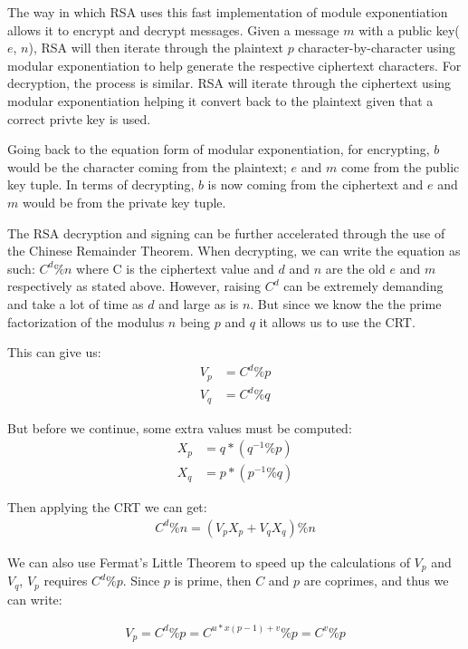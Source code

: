 \documentclass[11pt]{article}
\begin{document}
		The way in which RSA uses this fast implementation of module exponentiation allows it to encrypt and decrypt messages. Given a message $m$ with a public key($e$, $n$), RSA will then iterate through the plaintext $p$ character-by-character using modular exponentiation to help generate the respective ciphertext characters. For decryption, the process is similar. RSA will iterate through the ciphertext using modular exponentiation helping it convert back to the plaintext given that a correct privte key is used. 

		Going back to the equation form of modular exponentiation, for encrypting, $b$ would be the character coming from the plaintext; $e$ and $m$ come from the public key tuple. In terms of decrypting, $b$ is now coming from the ciphertext and $e$ and $m$ would be from the private key tuple.

		The RSA decryption and signing can be further accelerated through the use of the Chinese Remainder Theorem. When decrypting, we can write the equation as such: $C^d\%n$ where C is the ciphertext value and $d$ and $n$ are the old $e$ and $m$ respectively as stated above. However, raising $C^d$ can be extremely demanding and take a lot of time as $d$ and large as is $n$. But since we know the the prime factorization of the modulus $n$ being $p$ and $q$ it allows us to use the CRT. 

		This can give us:
		\begin{align*}	
			V_p &= C^d \% p\\
			V_q &= C^d \% q
		\end{align*}	

		But before we continue, some extra values must be computed:
		\begin{align*}	
			X_p &= q * (q^{-1}\% p)\\
			X_q &= p * (p^{-1}\% q)
		\end{align*}

		Then applying the CRT we can get:
		\begin{align*}
			C^d \% n = (V_pX_p + V_qX_q)\%n
		\end{align*}	

		We can also use Fermat's Little Theorem to speed up the calculations of $V_p$ and $V_q$, $V_p$ requires $C^d \% p$. Since $p$ is prime, then $C$ and $p$ are coprimes, and thus we can write:

		\begin{align*}
			V_p = C^d\%p = C^{u*x(p-1)+v}\%p = C^v \% p
		\end{align*}
\end{document}
